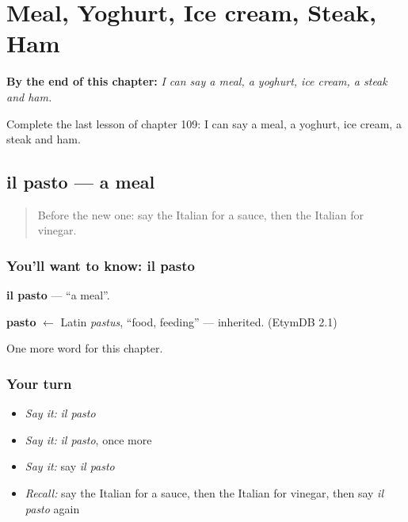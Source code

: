 
\chapter{Meal, Yoghurt, Ice cream, Steak, Ham}
\label{ch:it-meal-yoghurt-ice-cream-steak-ham}

\begin{chapteropening}
\textbf{By the end of this chapter:} \emph{I can say a meal, a yoghurt, ice cream, a steak and ham.}

Complete the last lesson of chapter 109: I can say a meal, a yoghurt, ice cream, a steak and ham.
\end{chapteropening}

\section[il pasto]{il pasto — a meal}

\label{lesson:IT-C109-pasto}



\begin{quote}
Before the new one: say the Italian for a sauce, then the Italian for vinegar.
\end{quote}

\subsection*{You'll want to know: il pasto}
\textbf{il pasto} — \textquotedblleft{}a meal\textquotedblright{}.

\begin{cousinweb}
\textbf{pasto} $\leftarrow$ Latin \emph{pastus}, \textquotedblleft{}food, feeding\textquotedblright{} — inherited. (EtymDB 2.1)
\end{cousinweb}

\begin{grammarlens}[title={What you've built}]
One more word for this chapter.
\end{grammarlens}

\subsection*{Your turn}
\begin{itemize}
\raggedright
  \item \emph{Say it:} \emph{il pasto}
  \item \emph{Say it:} \emph{il pasto}, once more
  \item \emph{Say it:} say \emph{il pasto}
  \item \emph{Recall:} say the Italian for a sauce, then the Italian for vinegar, then say \emph{il pasto} again
\end{itemize}

